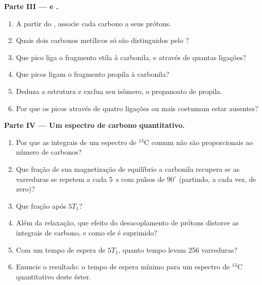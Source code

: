 \begin{problem}
\medskip\noindent\textbf{Parte III ---  e .}
\begin{enumerate}[resume]
  \item A partir do , associe cada carbono a seus prótons.
  \item Quais dois carbonos metílicos só são distinguidos pelo ?
  \item Que pico  liga o fragmento etila à carbonila, e através de
        quantas ligações?
  \item Que picos  ligam o fragmento propila à carbonila?
  \item Deduza a estrutura e exclua seu isômero, o propanoato de propila.
  \item Por que os picos  através de quatro ligações ou mais costumam estar ausentes?
\end{enumerate}

\medskip\noindent\textbf{Parte IV --- Um espectro de carbono quantitativo.}
\begin{enumerate}[resume]
  \item Por que as integrais de um espectro de ${}^{13}$C comum não são proporcionais
        ao número de carbonos?
  \item Que fração de sua magnetização de equilíbrio a carbonila recupera se as
        varreduras se repetem a cada \qty{5}{s} com pulsos de $90^\circ$ (partindo, a cada vez,
        de zero)?
  \item Que fração após $5T_1$?
  \item Além da relaxação, que efeito do desacoplamento de prótons distorce as
        integrais de carbono, e como ele é suprimido?
  \item Com um tempo de espera de $5T_1$, quanto tempo levam 256 varreduras?
  \item Enuncie o resultado: o tempo de espera mínimo para um espectro de ${}^{13}$C
        quantitativo deste éster.
\end{enumerate}
\end{problem}

